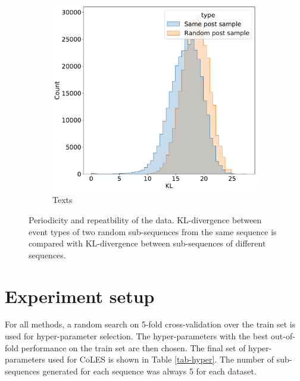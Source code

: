 \documentclass[sigconf]{acmart}
\begin{document}
\begin{figure}
\begin{subfigure}{0.5\linewidth}
  \end{subfigure}
  \begin{subfigure}{0.5\linewidth}
    \caption{Texts}
    \includegraphics[width=\linewidth]{figures/kl_dis_text.pdf}
  \end{subfigure}
  \caption{Periodicity and repeatbility of the data. KL-divergence between event types of two random sub-sequences from the same sequence is compared with KL-divergence between sub-sequences of different sequences.}
  \label{fig-subseq-kl}
\end{figure}

\section{Experiment setup} \label{app-sec-exp-setup}

For all methods, a random search on 5-fold cross-validation over the train set is used for hyper-parameter selection. The hyper-parameters with the best out-of-fold performance on the train set are then chosen. The final set of hyper-parameters used for CoLES is shown in Table \ref{tab-hyper}. The number of sub-sequences generated for each sequence was always 5 for each dataset.
\end{document}
